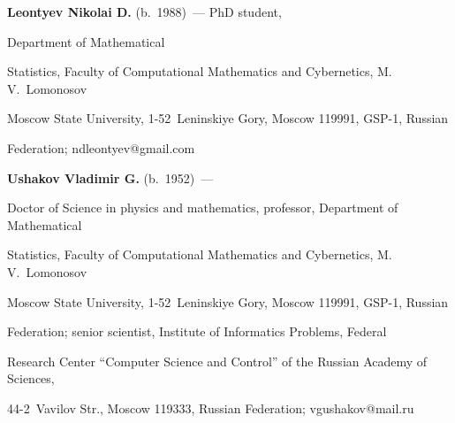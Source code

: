 \Contr





\noindent


\textbf{Leontyev Nikolai D.} (b.\ 1988)~--- PhD student,


Department of Mathematical 


Statistics, Faculty of Computational Mathematics and Cybernetics, M.\,V.~Lomonosov 


Moscow State University, 1-52~Leninskiye Gory, Moscow 119991, GSP-1, Russian 


Federation; \mbox{ndleontyev@gmail.com}





\vspace*{3pt}





\noindent


\textbf{Ushakov Vladimir G.} (b.\ 1952)~---


Doctor of Science in physics and mathematics, professor, Department of Mathematical 


Statistics, Faculty of Computational Mathematics and Cybernetics, M.\,V.~Lomonosov 


Moscow State University, 1-52~Leninskiye Gory, Moscow 119991, GSP-1, Russian 


Federation; senior scientist, Institute of Informatics Problems, Federal 


Research Center ``Computer Science and Control'' of the Russian Academy of Sciences, 


44-2~Vavilov Str., Moscow 119333, Russian Federation; \mbox{vgushakov@mail.ru} 


\label{end\stat}








\renewcommand{\bibname}{\protect\rm Литература}


